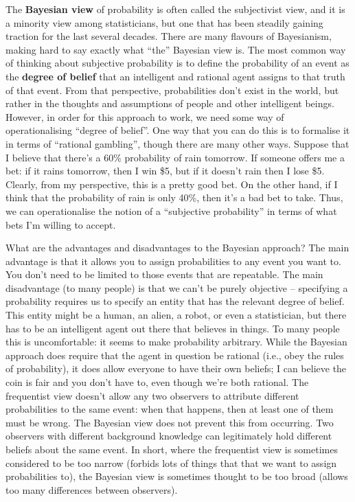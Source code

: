 \documentclass[]{book}
\begin{document}
The \textbf{Bayesian view} of probability is often called the subjectivist view, and it is a minority view among statisticians, but one that has been steadily gaining traction for the last several decades. There are many flavours of Bayesianism, making hard to say exactly what ``the'' Bayesian view is. The most common way of thinking about subjective probability is to define the probability of an event as the \textbf{degree of belief} that an intelligent and rational agent assigns to that truth of that event. From that perspective, probabilities don't exist in the world, but rather in the thoughts and assumptions of people and other intelligent beings. However, in order for this approach to work, we need some way of operationalising ``degree of belief''. One way that you can do this is to formalise it in terms of ``rational gambling'', though there are many other ways. Suppose that I believe that there's a 60\% probability of rain tomorrow. If someone offers me a bet: if it rains tomorrow, then I win \$5, but if it doesn't rain then I lose \$5. Clearly, from my perspective, this is a pretty good bet. On the other hand, if I think that the probability of rain is only 40\%, then it's a bad bet to take. Thus, we can operationalise the notion of a ``subjective probability'' in terms of what bets I'm willing to accept.

What are the advantages and disadvantages to the Bayesian approach? The main advantage is that it allows you to assign probabilities to any event you want to. You don't need to be limited to those events that are repeatable. The main disadvantage (to many people) is that we can't be purely objective -- specifying a probability requires us to specify an entity that has the relevant degree of belief. This entity might be a human, an alien, a robot, or even a statistician, but there has to be an intelligent agent out there that believes in things. To many people this is uncomfortable: it seems to make probability arbitrary. While the Bayesian approach does require that the agent in question be rational (i.e., obey the rules of probability), it does allow everyone to have their own beliefs; I can believe the coin is fair and you don't have to, even though we're both rational. The frequentist view doesn't allow any two observers to attribute different probabilities to the same event: when that happens, then at least one of them must be wrong. The Bayesian view does not prevent this from occurring. Two observers with different background knowledge can legitimately hold different beliefs about the same event. In short, where the frequentist view is sometimes considered to be too narrow (forbids lots of things that that we want to assign probabilities to), the Bayesian view is sometimes thought to be too broad (allows too many differences between observers).
\end{document}
